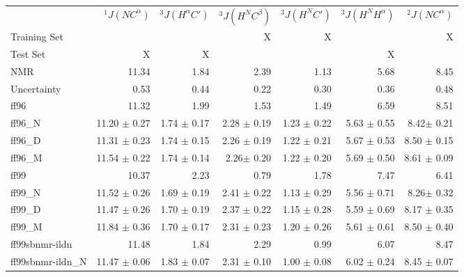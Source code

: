 \documentclass[12pt]{article}
\begin{document}
\tiny

\begin{table}
\begin{tabular}{lrrrrrr}
\toprule
  &  $^1J(NC^\alpha)$ & $^3J(H^\alpha C\prime)$ & $^3J(H^NC^\beta)$ &  $^3J(H^NC\prime)$ &  $^3J(H^NH^\alpha)$ &  $^2J(NC^\alpha)$ \\
Training Set &    &    & X & X &    & X \\
Test     Set & X  & X  &   &   & X  &   \\
NMR                         &    11.34 &          1.84 &      2.39 &          1.13 &      5.68 &     8.45 \\
Uncertainty                 &     0.53 &          0.44 &      0.22 &          0.30 &      0.36 &     0.48 \\
\toprule
ff96                     &    11.32 &          1.99 &      1.53 &          1.49 &      6.59 &     8.51 \\
ff96\_N                 &    11.20 $\pm$ 0.27 &          1.74  $\pm$ 0.17 &      2.28  $\pm$ 0.19 &          1.23 $\pm$ 0.22 &      5.63 $\pm$ 0.55 &     8.42$\pm$ 0.21 \\
ff96\_D           &    11.31 $\pm$ 0.23 &          1.74 $\pm$ 0.15 &      2.26  $\pm$ 0.19 &          1.22 $\pm$ 0.21  &      5.67 $\pm$ 0.53  &     8.50  $\pm$ 0.15 \\
ff96\_M              &    11.54 $\pm$ 0.22 &          1.74 $\pm$ 0.14  &      2.26$\pm$ 0.20  &          1.22  $\pm$ 0.20  &      5.69 $\pm$ 0.50 &     8.61 $\pm$ 0.09\\
\toprule
ff99                     &    10.37 &          2.23 &      0.79 &          1.78 &      7.47 &     6.41 \\
ff99\_N                 &    11.52 $\pm$ 0.26 &          1.69 $\pm$ 0.19 &      2.41 $\pm$ 0.22 &          1.13 $\pm$ 0.29  &      5.56 $\pm$ 0.71 &     8.26$\pm$ 0.32 \\
ff99\_D           &    11.47 $\pm$ 0.26 &          1.70 $\pm$ 0.19  &      2.37 $\pm$ 0.22  &          1.15 $\pm$ 0.28  &      5.59 $\pm$ 0.69 &     8.17 $\pm$ 0.35 \\
ff99\_M              &    11.84  $\pm$ 0.36&          1.70 $\pm$ 0.17 &      2.31 $\pm$ 0.23  &          1.20 $\pm$ 0.26  &      5.61 $\pm$ 0.61  &     8.50 $\pm$ 0.40  \\
\toprule
ff99sbnmr-ildn           &    11.48 &          1.84 &      2.29 &          0.99 &      6.07 &     8.47 \\
ff99sbnmr-ildn\_N       &    11.47 $\pm$ 0.06 &          1.83 $\pm$ 0.07 &      2.31 $\pm$ 0.10 &          1.00  $\pm$ 0.08 &      6.02 $\pm$ 0.24 &     8.45 $\pm$ 0.07 \\

\end{tabular}
\end{table}
\end{document}
